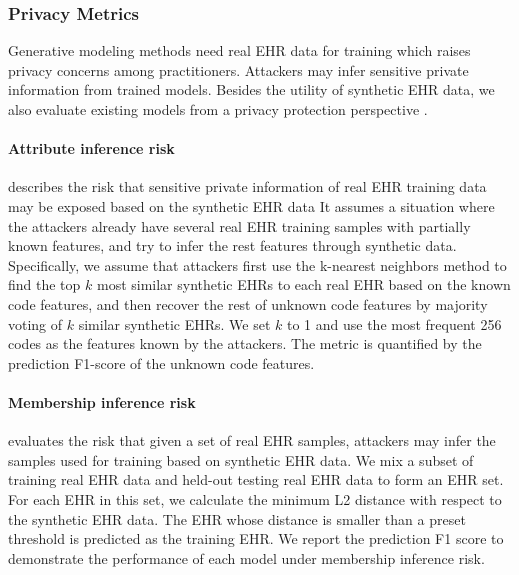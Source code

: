 \subsubsection{Privacy Metrics}

Generative modeling methods need real EHR data for training which raises privacy concerns among practitioners. Attackers may infer sensitive private information from trained models. Besides the utility of synthetic EHR data, we also evaluate existing models from a privacy protection perspective \citep{pmlr-v68-choi17a,EHRgan,Yan2022AMB}.

\paragraph{Attribute inference risk} describes the risk that sensitive private information of real EHR training data may be exposed based on the synthetic EHR data
It assumes a situation where the attackers already have several real EHR training samples with partially known features, and try to infer the rest features through synthetic data.  
Specifically, we assume that attackers first use the k-nearest neighbors method to find the top $k$ most similar synthetic EHRs to each real EHR based on the known code features, and then recover the rest of unknown code features by majority voting of $k$ similar synthetic EHRs. We set $k$ to 1 and use the most frequent 256 codes as the features known by the attackers. The metric is quantified by the prediction F1-score of the unknown code features.

\paragraph{Membership inference risk} evaluates the risk that given a set of real EHR samples, attackers may infer the samples used for training based on synthetic EHR data. We mix a subset of training real EHR data and held-out testing real EHR data to form an EHR set. For each EHR in this set, we calculate the minimum L2 distance with respect to the synthetic EHR data. The EHR whose distance is smaller than a preset threshold is predicted as the training EHR. We report the prediction F1 score to demonstrate the performance of each model under membership inference risk.


